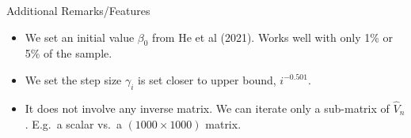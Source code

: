 \documentclass[beamer, t]{beamer}
\begin{document}

\begin{frame}{Additional Remarks/Features}
	
	\begin{itemize}
		\item 
		We set an initial value $\beta_0$ from He et al (2021). Works well with only 1\% or 5\% of the sample. 
		
		\item We set the step size $ \gamma_{i} $ is set closer to upper bound, $ i^{-0.501} $. 

		\item It does not involve any inverse matrix. We can iterate only a sub-matrix of $\widehat{V}_n$. E.g.~a scalar vs.~a $(1000\times 1000)$ matrix.
	\end{itemize}
	
\end{frame}
\end{document}
